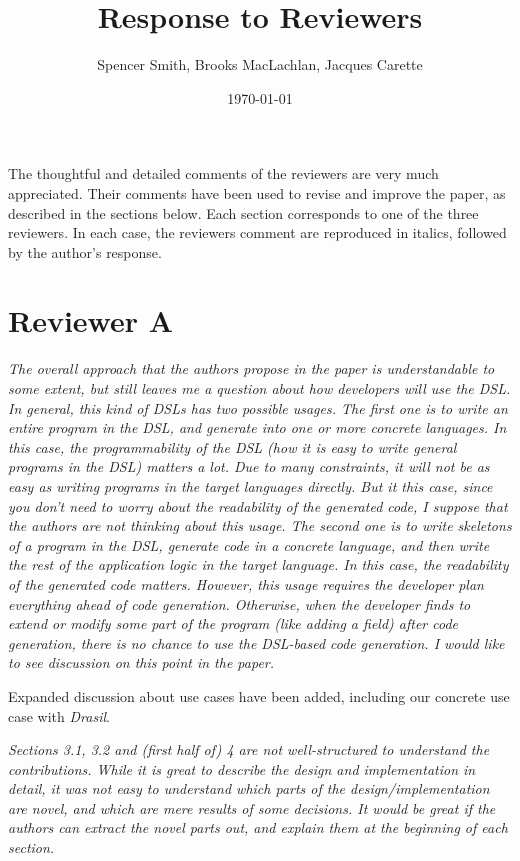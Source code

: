 \documentclass[12pt]{article}
\title{Response to Reviewers}
\author{Spencer Smith, Brooks MacLachlan, Jacques Carette}
\date{\today}
\begin{document}
\maketitle

The thoughtful and detailed comments of the reviewers are very much appreciated.
Their comments have been used to revise and improve the paper, as described in
the sections below.  Each section corresponds to one of the three reviewers.  In
each case, the reviewers comment are reproduced in italics, followed by the
author's response.

\section{Reviewer A}

\textit{The overall approach that the authors propose in the paper is 
understandable to some extent, but still leaves me a question about how 
developers will use the DSL.
	In general, this kind of DSLs has two possible usages.  The first one is to 
	write an entire program in the DSL, and generate into one or more concrete 
	languages.  In this case, the programmability of the DSL (how it is easy to 
	write general programs in the DSL) matters a lot.  Due to many constraints, 
	it will not be as easy as writing programs in the target languages 
	directly.  But it this case, since you don't need to worry about the 
	readability of the generated code, I suppose that the authors are not 
	thinking about this usage.
	The second one is to write skeletons of a program in the DSL, generate code 
	in a concrete language, and then write the rest of the application logic in 
	the target language.  In this case, the readability of the generated code 
	matters.  However, this usage requires the developer plan everything ahead 
	of code generation.  Otherwise, when the developer finds to extend or 
	modify some part of the program (like adding a field) after code 
	generation, there is no chance to use the DSL-based code generation.
	I would like to see discussion on this point in the paper.}

Expanded discussion about use cases have been added, including our concrete use 
case with \textit{Drasil}.

\textit{Sections 3.1, 3.2 and (first half of) 4 are not well-structured to 
understand the contributions.  While it is great to describe the design and 
implementation in detail, it was not easy to understand which parts of the 
design/implementation are novel, and which are mere results of some decisions.  
It would be great if the authors can extract the novel parts out, and explain 
them at the beginning of each section.}
\end{document}
